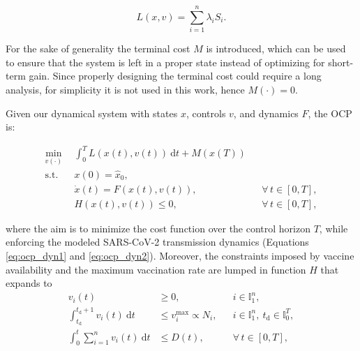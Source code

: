 \begin{equation*}
    L(x,v) = \sum_{i=1}^n \lambda_i S_i.
\end{equation*}

For the sake of generality the terminal cost $M$ is introduced, which can be used to ensure that the system is left in a proper state instead of optimizing for short-term gain. Since properly designing the terminal cost could require a long analysis, for simplicity it is not used in this work, hence $M(\cdot) = 0$.

Given our dynamical system with states $x$, controls $v$, and dynamics $F$, the OCP is:

\begin{subequations}
    \label{eq:ocp}
    \begin{align}
        \min_{v(\cdot)} \ \ & \int_{0}^{T} L(x(t),v(t)) \ \mathrm{d}t + M(x(T)) \\ \label{eq:ocp_dyn1}
        \mathrm{s.t.} \ \ & x(0) = \hat x_0, \\ \label{eq:ocp_dyn2}
        &\dot x(t) = F(x(t),v(t)), && \forall \, t\in[0,T], \\ 
        &H(x(t),v(t)) \leq 0, && \forall \, t\in[0,T],
    \end{align}
\end{subequations}

where the aim is to minimize the cost function over the control horizon $T$, while enforcing the modeled SARS-CoV-2 transmission dynamics (Equations \eqref{eq:ocp_dyn1} and \eqref{eq:ocp_dyn2}). Moreover, the constraints imposed by vaccine availability and the maximum vaccination rate are lumped in function $H$ that expands to
\begin{subequations}
    \begin{align}
        v_i(t) &\geq 0, && i\in\mathbb{I}_1^n, \label{eq:constr_vacc_met} \\
        \int_{t_\mathrm{d}}^{t_\mathrm{d}+1} v_i(t) \ \mathrm{d}t &\leq v_i^\mathrm{max} \propto N_i, && i\in\mathbb{I}_1^n,\ t_\mathrm{d} \in \mathbb{I}_0^T,  \label{eq:constr_day_met} \\
        \int_{0}^{t} \sum_{i=1}^n v_i(t) \ \mathrm{d}t &\leq D(t), && \forall \, t\in[0,T], \label{eq:constr_week_met}
    \end{align}
\end{subequations}

